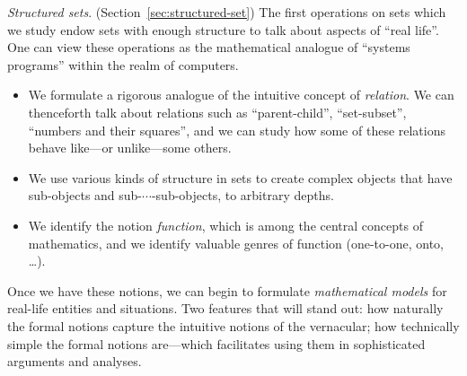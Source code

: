 {\it Structured sets}.  (Section~\ref{sec:structured-set}) The first operations on sets which we study endow sets with enough structure to talk about aspects of  ``real life''.  One can view these operations as the mathematical analogue of ``systems programs'' within the realm of computers.
\begin{itemize}
\item
We formulate a rigorous analogue of the intuitive concept of {\it relation}.  We can thenceforth talk about relations such as ``parent-child'', ``set-subset'', ``numbers and their squares'', and we can study how some of these relations behave like---or unlike---some others.
\medskip\item
We use various kinds of structure in sets to create complex objects that have sub-objects and sub-$\cdots$-sub-objects, to arbitrary depths.
\medskip\item
We identify the notion {\it function}, which is among the central concepts of mathematics, and we identify valuable genres of function (one-to-one, onto, \ldots).
\end{itemize}
Once we have these notions, we can begin to formulate {\it mathematical models} for real-life entities and situations.  Two features that will stand out: how naturally the formal notions capture the intuitive notions of the vernacular; how technically simple the formal notions are---which facilitates using them in sophisticated arguments and analyses.

\bigskip

